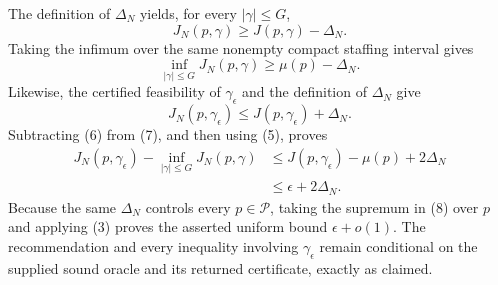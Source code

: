 The definition of \(\Delta_N\) yields, for every \(|\gamma|\leq G\),
\[
 J_N(p,\gamma)\geq J(p,\gamma)-\Delta_N.
\]
Taking the infimum over the same nonempty compact staffing interval gives
\[
 \inf_{|\gamma|\leq G}J_N(p,\gamma)
 \geq \mu(p)-\Delta_N.                                      \tag{6}
\]
Likewise, the certified feasibility of \(\gamma_\epsilon\) and the definition of \(\Delta_N\) give
\[
 J_N(p,\gamma_\epsilon)
 \leq J(p,\gamma_\epsilon)+\Delta_N.                        \tag{7}
\]
Subtracting (6) from (7), and then using (5), proves
\[
\begin{aligned}
 J_N(p,\gamma_\epsilon)
 -\inf_{|\gamma|\leq G}J_N(p,\gamma)
 &\leq J(p,\gamma_\epsilon)-\mu(p)+2\Delta_N \\
 &\leq\epsilon+2\Delta_N.                                  \tag{8}
\end{aligned}
\]
Because the same \(\Delta_N\) controls every \(p\in\mathcal P\), taking the supremum in (8) over \(p\) and applying (3) proves the asserted uniform bound \(\epsilon+o(1)\).  The recommendation and every inequality involving \(\gamma_\epsilon\) remain conditional on the supplied sound oracle and its returned certificate, exactly as claimed.
